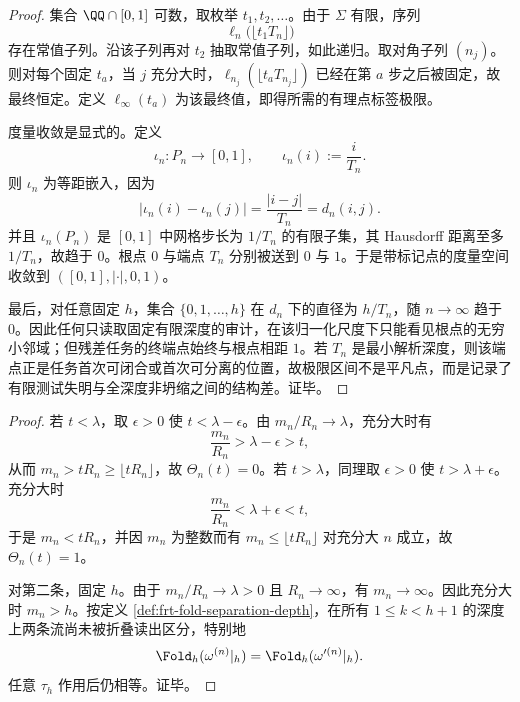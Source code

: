 \begin{proof}
集合 \(\QQ\cap[0,1]\) 可数，取枚举 \(t_1,t_2,\ldots\)。由于 \(
\Sigma\) 有限，序列
\[
\ell_n\bigl(\lfloor t_1T_n\rfloor\bigr)
\]
存在常值子列。沿该子列再对 \(t_2\) 抽取常值子列，如此递归。取对角子列 \((n_j)\)。则对每个固定 \(t_a\)，当 \(j\) 充分大时，\(
\ell_{n_j}(\lfloor t_aT_{n_j}\rfloor)
\) 已经在第 \(a\) 步之后被固定，故最终恒定。定义 \(\ell_\infty(t_a)
\) 为该最终值，即得所需的有理点标签极限。

度量收敛是显式的。定义
\[
\iota_n:P_n\longrightarrow[0,1],\qquad \iota_n(i):=\frac{i}{T_n}.
\]
则 \(\iota_n\) 为等距嵌入，因为
\[
|\iota_n(i)-\iota_n(j)|=\frac{|i-j|}{T_n}=d_n(i,j).
\]
并且 \(\iota_n(P_n)\) 是 \([0,1]\) 中网格步长为 \(1/T_n\) 的有限子集，其 Hausdorff 距离至多 \(1/T_n\)，故趋于 \(0\)。根点 \(0\) 与端点 \(T_n\) 分别被送到 \(0\) 与 \(1\)。于是带标记点的度量空间收敛到 \(([0,1],|\cdot|,0,1)\)。

最后，对任意固定 \(h\)，集合 \(\{0,
1,\ldots,h\}\) 在 \(d_n\) 下的直径为 \(h/T_n\)，随 \(n\to\infty\) 趋于 \(0\)。因此任何只读取固定有限深度的审计，在该归一化尺度下只能看见根点的无穷小邻域；但残差任务的终端点始终与根点相距 \(1\)。若 \(T_n\) 是最小解析深度，则该端点正是任务首次可闭合或首次可分离的位置，故极限区间不是平凡点，而是记录了有限测试失明与全深度非坍缩之间的结构差。证毕。
\end{proof}

\begin{proof}
若 \(t<\lambda\)，取 \(\epsilon>0\) 使 \(t<\lambda-\epsilon\)。由 \(m_n/R_n\to\lambda\)，充分大时有
\[
\frac{m_n}{R_n}>\lambda-\epsilon>t,
\]
从而 \(m_n>tR_n\ge \lfloor tR_n\rfloor\)，故 \(\Theta_n(t)=0\)。若 \(t>\lambda\)，同理取 \(\epsilon>0\) 使 \(t>\lambda+\epsilon\)。充分大时
\[
\frac{m_n}{R_n}<\lambda+\epsilon<t,
\]
于是 \(m_n<tR_n\)，并因 \(m_n\) 为整数而有 \(m_n\le\lfloor tR_n\rfloor\) 对充分大 \(n\) 成立，故 \(\Theta_n(t)=1\)。

对第二条，固定 \(h\)。由于 \(m_n/R_n\to\lambda>0\) 且 \(R_n\to\infty\)，有 \(m_n\to\infty\)。因此充分大时 \(m_n>h\)。按定义 \ref{def:frt-fold-separation-depth}，在所有 \(1\le k<h+1\) 的深度上两条流尚未被折叠读出区分，特别地
\[
\Fold_h(\omega^{(n)}|_h)=\Fold_h(\omega'^{(n)}|_h).
\]
任意 \(\tau_h\) 作用后仍相等。证毕。
\end{proof}

